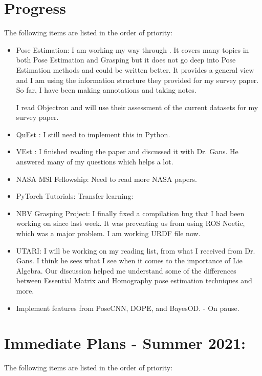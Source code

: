 \documentclass[11pt]{article}
\begin{document}
\section{Progress}
The following items are listed in the order of priority:
\begin{itemize}
      \item Pose Estimation: I am working my way through \cite{du2020vision}.
      It covers many topics in both Pose Estimation and Grasping but it does not go deep into Pose Estimation methods and could be written better. It provides a general view and I am using the information structure they provided for my survey paper. So far, I have been making annotations and taking notes.

      I read Objectron \cite{ahmadyan2020objectron} and will use their assessment of the current datasets for my survey paper.

      \item QuEst \cite{QuEst}: I still need to implement this in Python.

      \item VEst \cite{dani2009position}: I finished reading the paper and discussed it with Dr. Gans. He answered many of my questions which helps a lot.

      \item NASA MSI Fellowship: Need to read more NASA papers.

      \item PyTorch Tutorials: Transfer learning:


      \item NBV Grasping Project: I finally fixed a compilation bug that I had been working on since last week. It was preventing us from using ROS Noetic, which was a major problem. I am working URDF file now.

      \item UTARI: I will be working on my reading list, from what I received from Dr. Gans. I think he sees what I see when it comes to the importance of Lie Algebra. Our discussion helped me understand some of the differences between Essential Matrix and Homography pose estimation techniques and more.

      \item Implement features from PoseCNN, DOPE, and BayesOD. - On pause.
\end{itemize}


\section{Immediate Plans - Summer 2021:}
The following items are listed in the order of priority:
\end{document}
